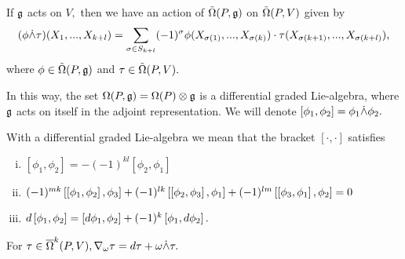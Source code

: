 If $\mathfrak{g}$ acts on $V,$ then we have an action of $\tilde{\Omega}(P, \mathfrak{g})$ on $\tilde{\Omega}(P,V)$ given by
$$
(\phi \dot{\wedge} \tau)(X_{1},...,X_{k+l})=
\sum_{\sigma \in S_{k+l}} (-1)^\sigma \phi(X_{\sigma(1)},...,X_{\sigma(k)})\cdot
\tau(X_{\sigma(k+1)},...,X_{\sigma(k+l)}),
$$
where $\phi \in \tilde{\Omega}(P, \mathfrak{g})$ and $\tau \in \tilde{\Omega}(P, V).$

In this way, the set $\Omega(P, \mathfrak{g})= \Omega(P) \otimes \mathfrak{g}$ is a differential graded Lie-algebra, where $\mathfrak{g}$
acts on itself in the adjoint representation. We will denote $[\phi_{1}, \phi_{2}]=\phi_{1}\dot{\wedge}\phi_{2}.$

With a differential graded Lie-algebra we mean that the bracket $[\cdot, \cdot]$ satisfies
\begin{enumerate}[(i)]
 \item $[\phi_{1}, \phi_{2}]=-(-1)^{kl}[\phi_{2}, \phi_{1}]$
\item $(-1)^{mk}\left[\left[\phi_{1},\phi_{2}\right],\phi_{3}\right]+ (-1)^{lk}\left[\left[\phi_{2},\phi_{3}\right],\phi_{1}\right]
+(-1)^{lm}\left[\left[\phi_{3},\phi_{1}\right],\phi_{2}\right]=0$
\item $d\left[\phi_{1},\phi_{2}\right]=\left[d\phi_{1},\phi_{2}\right]+(-1)^{k}\left[\phi_{1},d\phi_{2}\right].$
\end{enumerate}

\begin{thm}[\cite{DB}, 3.1.5]
 \label{JB:4.8}
For $\tau \in \overline{\Omega}^{k}(P, V),
\nabla_{\omega}\tau=d\tau + \omega \dot{\wedge} \tau.
$
\end{thm}

